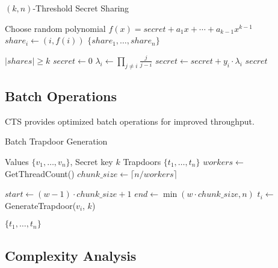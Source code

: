 \documentclass[../main_comprehensive.tex]{subfiles}
\begin{document}
\begin{algorithm}
\caption{$(k, n)$-Threshold Secret Sharing}
\label{alg:secret_sharing}
\begin{algorithmic}[1]
  \STATE Choose random polynomial $f(x) = secret + a_1x + \cdots + a_{k-1}x^{k-1}$
    \STATE $share_i \leftarrow (i, f(i))$
  \ENDFOR
  \RETURN $\{share_1, \ldots, share_n\}$
\ENDPROCEDURE

  \REQUIRE $|shares| \geq k$
  \STATE $secret \leftarrow 0$
    \STATE $\lambda_i \leftarrow \prod_{j \neq i} \frac{j}{j - i}$ 
    \STATE $secret \leftarrow secret + y_i \cdot \lambda_i$
  \ENDFOR
  \RETURN $secret$
\ENDPROCEDURE
\end{algorithmic}
\end{algorithm}

\subsection{Batch Operations}

CTS provides optimized batch operations for improved throughput.

\begin{algorithm}
\caption{Batch Trapdoor Generation}
\label{alg:batch_trapdoor}
\begin{algorithmic}[1]
\REQUIRE Values $\{v_1, \ldots, v_n\}$, Secret key $k$
\ENSURE Trapdoors $\{t_1, \ldots, t_n\}$
\STATE $workers \leftarrow$ GetThreadCount()
\STATE $chunk\_size \leftarrow \lceil n / workers \rceil$

  \STATE $start \leftarrow (w-1) \cdot chunk\_size + 1$
  \STATE $end \leftarrow \min(w \cdot chunk\_size, n)$
    \STATE $t_i \leftarrow$ GenerateTrapdoor($v_i$, $k$)
  \ENDFOR
\ENDPARFOR

\RETURN $\{t_1, \ldots, t_n\}$
\end{algorithmic}
\end{algorithm}

\subsection{Complexity Analysis}
\end{document}
